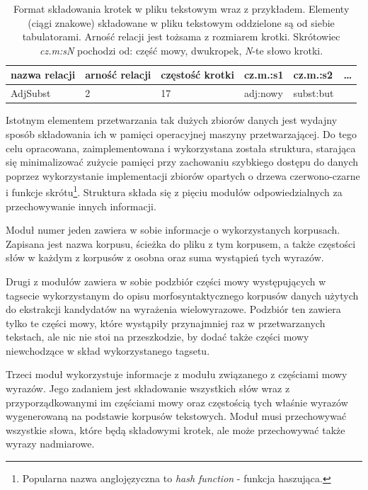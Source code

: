 \begin{table}[h!]
\centering
\begin{tabular}{l l l l l l}
\toprule
	\textbf{nazwa relacji} & 
		\textbf{arność relacji} & 
		\textbf{częstość krotki} & 
		\textbf{cz.m.:s1} & 
		\textbf{cz.m.:s2} & 
		\ldots \\
	\midrule
	AdjSubst & 2 & 17 & adj:nowy & subst:but & \\
\bottomrule
\end{tabular}
\caption[Format składowania krotek w pliku tekstowym]{Format składowania krotek w pliku tekstowym wraz z przykładem. Elementy (ciągi znakowe) składowane w pliku tekstowym oddzielone są od siebie tabulatorami. Arność relacji jest tożsama z rozmiarem krotki. Skrótowiec \emph{cz.m:sN} pochodzi od: część mowy, dwukropek, \emph{N}-te słowo krotki.}
\label{tuple_format}
\end{table}
\par
Istotnym elementem przetwarzania tak dużych zbiorów danych jest wydajny sposób składowania ich w pamięci operacyjnej maszyny przetwarzającej.
Do tego celu opracowana, zaimplementowana i wykorzystana została struktura, starająca się minimalizować zużycie pamięci przy zachowaniu szybkiego dostępu do danych poprzez wykorzystanie implementacji zbiorów opartych o drzewa czerwono-czarne i funkcje skrótu\footnote{Popularna nazwa anglojęzyczna to \emph{hash function} - funkcja haszująca.}.
Struktura składa się z pięciu modułów odpowiedzialnych za przechowywanie innych informacji.

\par
Moduł numer jeden zawiera w sobie informacje o wykorzystanych korpusach.
Zapisana jest nazwa korpusu, ścieżka do pliku z tym korpusem, a także częstości słów w każdym z korpusów z osobna oraz suma wystąpień tych wyrazów.

\par
Drugi z modułów zawiera w sobie podzbiór części mowy występujących w tagsecie wykorzystanym do opisu morfosyntaktycznego korpusów danych użytych do ekstrakcji kandydatów na wyrażenia wielowyrazowe.
Podzbiór ten zawiera tylko te części mowy, które wystąpiły przynajmniej raz w przetwarzanych tekstach, ale nic nie stoi na przeszkodzie, by dodać także części mowy niewchodzące w skład wykorzystanego tagsetu.

\par
Trzeci moduł wykorzystuje informacje z modułu związanego z częściami mowy wyrazów. 
Jego zadaniem jest składowanie wszystkich słów wraz z przyporządkowanymi im częściami mowy oraz częstością tych właśnie wyrazów wygenerowaną na podstawie korpusów tekstowych.
Moduł musi przechowywać wszystkie słowa, które będą składowymi krotek, ale może przechowywać także wyrazy nadmiarowe.


